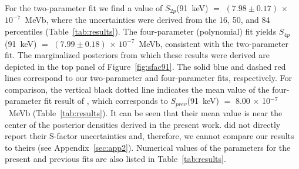\documentclass[twocolumn]{aastex63}
\begin{document}
For the two-parameter fit we find a value of $S_{2p}$(91~keV) $=$ $(7.98\pm0.17)$ $\times$ $10^{-7}$~MeVb, where the uncertainties were derived from the 16, 50, and 84 percentiles (Table~\ref{tab:results}). The four-parameter (polynomial) fit yields $S_{4p}$(91~keV) $=$ $(7.99\pm0.18)$ $\times$ $10^{-7}$~MeVb, consistent with the two-parameter fit. The marginalized posteriors from which these results were derived are depicted in the top panel of Figure~\ref{fig:sfac91}. The solid blue and dashed red lines correspond to our two-parameter and four-parameter fits, respectively. For comparison, the vertical black dotted line indicates the mean value of the four-parameter fit result of \citet{Pis21}, which corresponds to $S_{prev}$(91~keV) $=$ $8.00$ $\times$ 10$^{-7}$~MeVb (Table~\ref{tab:results}). It can be seen that their mean value is near the center of the posterior densities derived in the present work. \citet{Pis21} did not directly report their S-factor uncertainties and, therefore, we cannot compare our results to theirs (see Appendix~\ref{sec:app2}). Numerical values of the parameters for the present and previous fits are also listed in Table~\ref{tab:results}.

\end{document}
